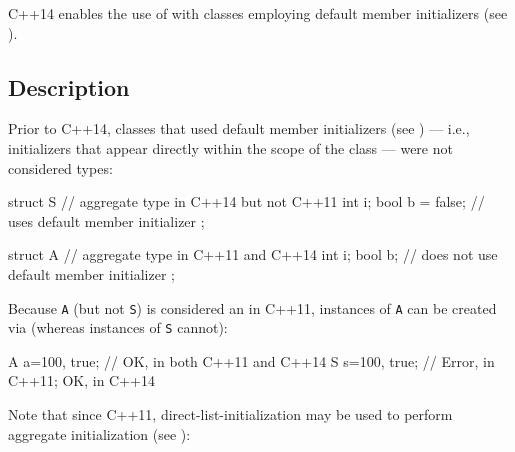 
\setcounter{table}{0}
\setcounter{footnote}{0}
\setcounter{lstlisting}{0}


C++14 enables the use of  with classes
employing default member initializers (see ).

\subsection[Description]{Description}\label{description}

Prior to C++14, classes that used default member initializers (see ) --- i.e., initializers that appear directly within the
scope of the class --- were not considered  types:

\begin{emcppslisting}[emcppsbatch={e1,e2,e3}]
struct S                // aggregate type in C++14 but not C++11
{
    int i;
    bool b = false;     // uses default member initializer
};

struct A                // aggregate type in C++11 and C++14
{
    int  i;
    bool b;             // does not use default member initializer
};
\end{emcppslisting}

\noindent Because \lstinline!A! (but not \lstinline!S!) is considered an  in
C++11, instances of \lstinline!A! can be created via  (whereas instances of \lstinline!S! cannot):

\begin{emcppslisting}[emcppsbatch=e1]
A a={100, true};  // OK, in both C++11 and C++14
S s={100, true};  // Error, in C++11; OK, in C++14
\end{emcppslisting}

\noindent Note that since C++11, direct-list-initialization may be used to perform aggregate initialization (see ):

